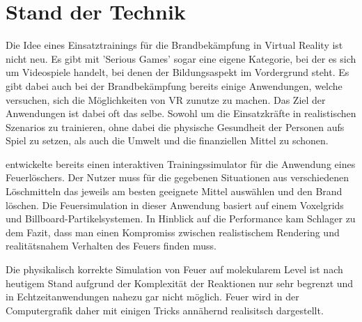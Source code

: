 \section{Stand der Technik}

Die Idee eines Einsatztrainings für die Brandbekämpfung in Virtual Reality ist nicht neu. Es gibt mit 
'Serious Games' sogar eine eigene Kategorie, bei der es sich um Videospiele handelt, bei denen der 
Bildungsaspekt im Vordergrund steht. 
Es gibt dabei auch bei der Brandbekämpfung bereits einige Anwendungen, welche versuchen, 
sich die Möglichkeiten von VR zunutze zu machen.
Das Ziel der Anwendungen ist dabei oft das selbe. Sowohl um die Einsatzkräfte in realistischen Szenarios 
zu trainieren, ohne dabei die physische Gesundheit der Personen aufs Spiel zu setzen, als auch die 
Umwelt und die finanziellen Mittel zu schonen.



\parencite{Schlager2017} entwickelte bereits einen interaktiven Trainingssimulator für die Anwendung 
eines Feuerlöschers. Der Nutzer muss für die gegebenen Situationen aus verschiedenen Löschmitteln das 
jeweils am besten geeignete Mittel auswählen und den Brand löschen. Die Feuersimulation in dieser 
Anwendung basiert auf einem Voxelgrids und Billboard-Partikelsystemen. In Hinblick auf die Performance kam Schlager
zu dem Fazit, dass man einen Kompromiss zwischen realistischem Rendering und realitätsnahem Verhalten 
des Feuers finden muss. 


Die physikalisch korrekte Simulation von Feuer auf molekularem Level ist nach heutigem
Stand aufgrund der Komplexität der Reaktionen nur sehr begrenzt und in Echtzeitanwendungen nahezu gar nicht
möglich. Feuer wird in der Computergrafik daher mit einigen Tricks annähernd realisitsch dargestellt. 


\newpage

